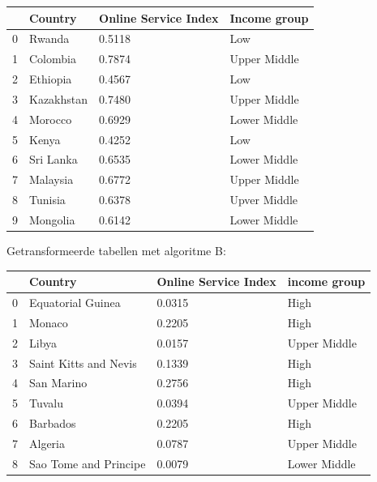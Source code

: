\begin{tabular}{llll}
\toprule
{} &     Country & Online Service Index &  Income group \\
\midrule
0 &      Rwanda &               0.5118 &           Low \\
1 &    Colombia &               0.7874 &  Upper Middle \\
2 &    Ethiopia &               0.4567 &           Low \\
3 &  Kazakhstan &               0.7480 &  Upper Middle \\
4 &     Morocco &               0.6929 &  Lower Middle \\
5 &       Kenya &               0.4252 &           Low \\
6 &   Sri Lanka &               0.6535 &  Lower Middle \\
7 &    Malaysia &               0.6772 &  Upper Middle \\
8 &     Tunisia &               0.6378 &  Upver Middle \\
9 &    Mongolia &               0.6142 &  Lower Middle \\
\bottomrule
\end{tabular}

Getransformeerde tabellen met algoritme B:

\begin{tabular}{llll}
\toprule
{} &                Country & Online Service Index &  income group \\
\midrule
0 &      Equatorial Guinea &               0.0315 &          High \\
1 &                 Monaco &               0.2205 &          High \\
2 &                  Libya &               0.0157 &  Upper Middle \\
3 &  Saint Kitts and Nevis &               0.1339 &          High \\
4 &             San Marino &               0.2756 &          High \\
5 &                 Tuvalu &               0.0394 &  Upper Middle \\
6 &               Barbados &               0.2205 &          High \\
7 &                Algeria &               0.0787 &  Upper Middle \\
8 &  Sao Tome and Principe &               0.0079 &  Lower Middle \\
\bottomrule
\end{tabular}

